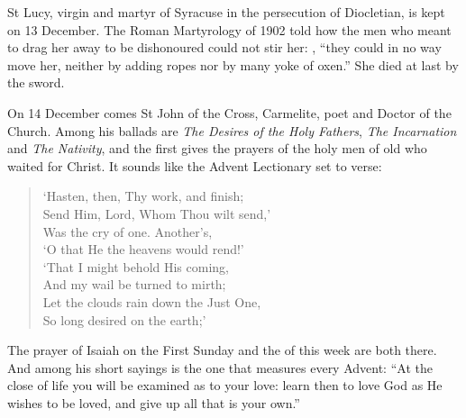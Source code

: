 St Lucy, virgin and martyr of Syracuse in the persecution of Diocletian, is
kept on 13 December. The Roman Martyrology of 1902 told how the men who meant to
drag her away to be dishonoured could not stir her:
, ``they could in no way move her, neither by adding ropes nor by many
yoke of oxen.'' She died at last by the sword.

On 14 December comes St John of the Cross, Carmelite, poet and Doctor of the
Church. Among his ballads are \emph{The Desires of the Holy Fathers},
\emph{The Incarnation} and \emph{The Nativity}, and the first gives the prayers
of the holy men of old who waited for Christ. It sounds like the Advent
Lectionary set to verse:

\begin{verse}
`Hasten, then, Thy work, and finish;\\
Send Him, Lord, Whom Thou wilt send,'\\
Was the cry of one. Another's,\\
`O that He the heavens would rend!'\\
`That I might behold His coming,\\
And my wail be turned to mirth;\\
Let the clouds rain down the Just One,\\
So long desired on the earth;'
\end{verse}

\noindent The prayer of Isaiah on the First Sunday and the  of this
week are both there. And among his short sayings is the one that measures every
Advent: ``At the close of life you will be examined as to your love: learn then
to love God as He wishes to be loved, and give up all that is your own.''
